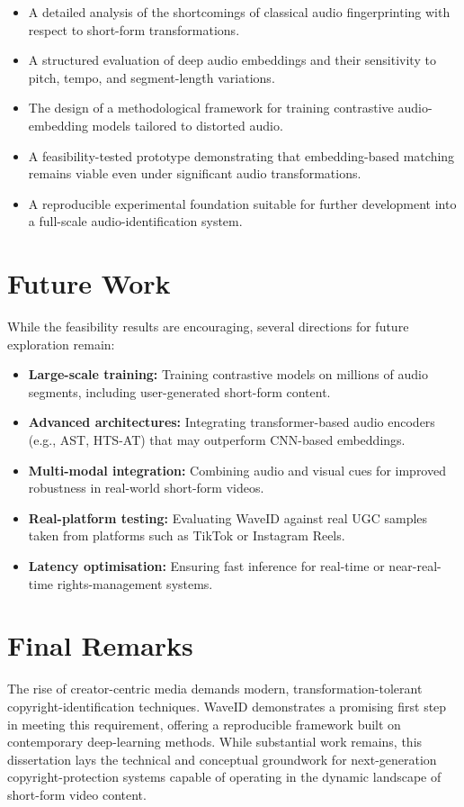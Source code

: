\documentclass[../Thesis]{subfiles}
\begin{document}
\begin{itemize}
    \item A detailed analysis of the shortcomings of classical audio fingerprinting with respect to short-form transformations.
    \item A structured evaluation of deep audio embeddings and their sensitivity to pitch, tempo, and segment-length variations.
    \item The design of a methodological framework for training contrastive audio-embedding models tailored to distorted audio.
    \item A feasibility-tested prototype demonstrating that embedding-based matching remains viable even under significant audio transformations.
    \item A reproducible experimental foundation suitable for further development into a full-scale audio-identification system.
\end{itemize}

\section{Future Work}
While the feasibility results are encouraging, several directions for future exploration remain:

\begin{itemize}
    \item \textbf{Large-scale training:} Training contrastive models on millions of audio segments, including user-generated short-form content.
    \item \textbf{Advanced architectures:} Integrating transformer-based audio encoders (e.g., AST, HTS-AT) that may outperform CNN-based embeddings.
    \item \textbf{Multi-modal integration:} Combining audio and visual cues for improved robustness in real-world short-form videos.
    \item \textbf{Real-platform testing:} Evaluating WaveID against real UGC samples taken from platforms such as TikTok or Instagram Reels.
    \item \textbf{Latency optimisation:} Ensuring fast inference for real-time or near-real-time rights-management systems.
\end{itemize}

\section{Final Remarks}
The rise of creator-centric media demands modern, transformation-tolerant copyright-identification techniques. WaveID demonstrates a promising first step in meeting this requirement, offering a reproducible framework built on contemporary deep-learning methods. While substantial work remains, this dissertation lays the technical and conceptual groundwork for next-generation copyright-protection systems capable of operating in the dynamic landscape of short-form video content.
\end{document}
